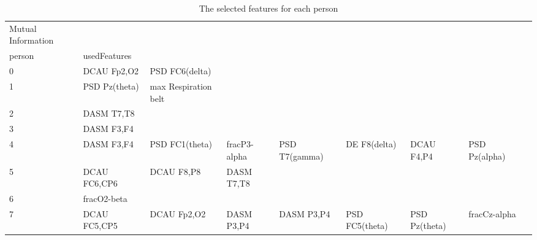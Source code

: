 \begin{landscape}
\begin{table}[]
\centering
\caption{The selected features for each person}
\begin{tabular}{l|llllllll}
Mutual Information &                      &                         &                      &                    &                       &                      &                 &                 \\
person             & usedFeatures         &                         &                      &                    &                       &                      &                 &                 \\
0                  & DCAU Fp2,O2          & PSD FC6(delta)          &                      &                    &                       &                      &                 &                 \\
1                  & PSD Pz(theta)        & max Respiration belt    &                      &                    &                       &                      &                 &                 \\
2                  & DASM T7,T8           &                         &                      &                    &                       &                      &                 &                 \\
3                  & DASM F3,F4           &                         &                      &                    &                       &                      &                 &                 \\
4                  & DASM F3,F4           & PSD FC1(theta)          & fracP3-alpha         & PSD T7(gamma)      & DE F8(delta)          & DCAU F4,P4           & PSD Pz(alpha)   &                 \\
5                  & DCAU FC6,CP6         & DCAU F8,P8              & DASM T7,T8           &                    &                       &                      &                 &                 \\
6                  & fracO2-beta          &                         &                      &                    &                       &                      &                 &                 \\
7                  & DCAU FC5,CP5         & DCAU Fp2,O2             & DASM P3,P4           & DASM P3,P4         & PSD FC5(theta)        & PSD Pz(theta)        & fracCz-alpha    &                 \\

\end{tabular}
\end{table}
\end{landscape}
